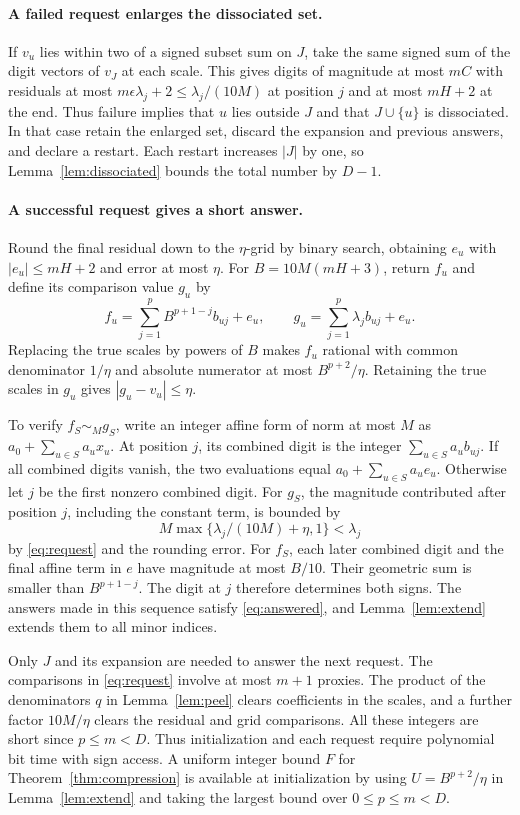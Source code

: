 \paragraph{A failed request enlarges the dissociated set.}
If \(v_u\) lies within two of a signed subset sum on \(J\), take
the same signed sum of the digit vectors of \(v_J\) at each scale.
This gives digits of magnitude at most \(mC\) with residuals at most
\(m\epsilon\lambda_j+2\le\lambda_j/(10M)\) at position \(j\)
and at most \(mH+2\) at the end. Thus failure implies that \(u\)
lies outside \(J\) and that \(J\cup\{u\}\) is dissociated.
In that case retain the enlarged set, discard the expansion and
previous answers, and declare a restart. Each restart increases
\(|J|\) by one, so Lemma~\ref{lem:dissociated} bounds the total
number by \(D-1\).

\paragraph{A successful request gives a short answer.}
Round the final residual down to the \(\eta\)-grid by binary search,
obtaining \(e_u\) with \(|e_u|\le mH+2\) and error at most \(\eta\).
For \(B=10M(mH+3)\), return \(f_u\) and define its comparison value
\(g_u\) by
\[
 f_u=\sum_{j=1}^p B^{p+1-j}b_{uj}+e_u,\qquad
 g_u=\sum_{j=1}^p\lambda_j b_{uj}+e_u .
\]
Replacing the true scales by powers of \(B\) makes \(f_u\) rational
with common denominator \(1/\eta\) and absolute numerator at most
\(B^{p+2}/\eta\). Retaining the true scales in \(g_u\) gives
\(|g_u-v_u|\le\eta\).

To verify \(f_S\sim_M g_S\), write an integer affine form of norm at
most \(M\) as \(a_0+\sum_{u\in S}a_u x_u\). At position \(j\), its
combined digit is the integer \(\sum_{u\in S}a_u b_{uj}\). If all
combined digits vanish, the two evaluations equal
\(a_0+\sum_{u\in S}a_u e_u\). Otherwise let \(j\) be the first
nonzero combined digit. For \(g_S\), the magnitude contributed
after position \(j\), including the constant term, is bounded by
\[
 M\max\{\lambda_j/(10M)+\eta,1\}<\lambda_j
\]
by \eqref{eq:request} and the rounding error. For \(f_S\), each later
combined digit and the final affine term in \(e\) have magnitude at
most \(B/10\). Their geometric sum is smaller than \(B^{p+1-j}\).
The digit at \(j\) therefore determines both signs. The answers made
in this sequence satisfy \eqref{eq:answered}, and
Lemma~\ref{lem:extend} extends them to all minor indices.

Only \(J\) and its expansion are needed to answer the next request.
The comparisons in \eqref{eq:request} involve at most \(m+1\)
proxies. The product of the denominators \(q\) in Lemma~\ref{lem:peel}
clears coefficients in the scales, and a further factor \(10M/\eta\)
clears the residual and grid comparisons. All these integers
are short since \(p\le m<D\).
Thus initialization and each request require polynomial bit time with
sign access. A uniform integer bound \(F\) for Theorem~\ref{thm:compression}
is available at initialization by using \(U=B^{p+2}/\eta\) in
Lemma~\ref{lem:extend} and taking the largest bound over
\(0\le p\le m<D\).

